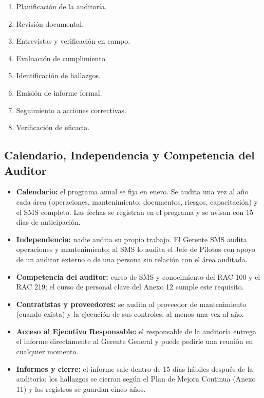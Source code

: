 \begin{enumerate}
    \item Planificación de la auditoría.

    \item Revisión documental.

    \item Entrevistas y verificación en campo.

    \item Evaluación de cumplimiento.

    \item Identificación de hallazgos.

    \item Emisión de informe formal.

    \item Seguimiento a acciones correctivas.

    \item Verificación de eficacia.
\end{enumerate}

\subsection{Calendario, Independencia y Competencia del Auditor}
\begin{itemize}
    \item \textbf{Calendario:} el programa anual se fija en enero. Se audita una vez al año cada área (operaciones, mantenimiento, documentos, riesgos, capacitación) y el SMS completo. Las fechas se registran en el programa y se avisan con 15 días de anticipación.
    \item \textbf{Independencia:} nadie audita su propio trabajo. El Gerente SMS audita operaciones y mantenimiento; al SMS lo audita el Jefe de Pilotos con apoyo de un auditor externo o de una persona sin relación con el área auditada.
    \item \textbf{Competencia del auditor:} curso de SMS y conocimiento del RAC 100 y el RAC 219; el curso de personal clave del Anexo 12 cumple este requisito.
    \item \textbf{Contratistas y proveedores:} se audita al proveedor de mantenimiento (cuando exista) y la ejecución de sus controles, al menos una vez al año.
    \item \textbf{Acceso al Ejecutivo Responsable:} el responsable de la auditoría entrega el informe directamente al Gerente General y puede pedirle una reunión en cualquier momento.
    \item \textbf{Informes y cierre:} el informe sale dentro de 15 días hábiles después de la auditoría; los hallazgos se cierran según el Plan de Mejora Continua (Anexo 11) y los registros se guardan cinco años.
\end{itemize}


